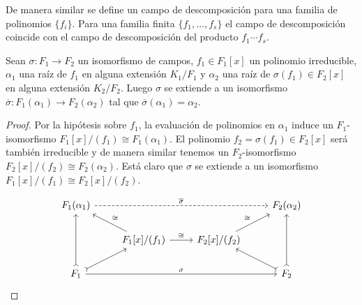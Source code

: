 \begin{comentario}
  De manera similar se define un campo de descomposición para una familia de
  polinomios $\{ f_i \}$. Para una familia finita $\{ f_1, \ldots, f_s \}$
  el campo de descomposición coincide con el campo de descomposición del
  producto $f_1 \cdots f_s$.
\end{comentario}

\begin{lema}
  \label{lema:extesion-de-isomorfismos-a-F(alpha)}
  Sean $\sigma\colon F_1\to F_2$ un isomorfismo de campos, $f_1 \in F_1 [x]$ un
  polinomio irreducible, $\alpha_1$ una raíz de $f_1$ en alguna extensión
  $K_1/F_1$ y $\alpha_2$ una raíz de $\sigma (f_1) \in F_2 [x]$ en alguna
  extensión $K_2/F_2$. Luego $\sigma$ se extiende a un isomorfismo
  $\overline{\sigma}\colon F_1 (\alpha_1) \to F_2 (\alpha_2)$ tal que
  $\overline{\sigma} (\alpha_1) = \alpha_2$.

  \begin{proof}
    Por la hipótesis sobre $f_1$, la evaluación de polinomios en $\alpha_1$
    induce un $F_1$-isomorfismo $F_1 [x]/(f_1) \cong F_1 (\alpha_1)$.
    El polinomio $f_2 = \sigma (f_1) \in F_2 [x]$ será también irreducible y
    de manera similar tenemos un $F_2$-isomorfismo
    $F_2[x]/(f_2) \cong F_2 (\alpha_2)$.  Está claro que $\sigma$ se extiende a
    un isomorfismo $F_1 [x]/(f_1) \cong F_2 [x]/(f_2)$.

    \[ \begin{tikzcd}
      F_1 (\alpha_1)\ar[dashed]{rrr}{\overline{\sigma}} & & & F_2 (\alpha_2) \\
       & F_1 [x]/(f_1) \ar{r}{\cong}\ar{ul}[swap]{\cong} & F_2 [x]/(f_2)\ar{ur}{\cong} \\
      F_1 \ar[>->]{uu}\ar[>->]{ur}\ar{rrr}{\sigma} & & & F_2\ar[>->]{uu}\ar[>->]{ul}
    \end{tikzcd} \]
  \end{proof}
\end{lema}

